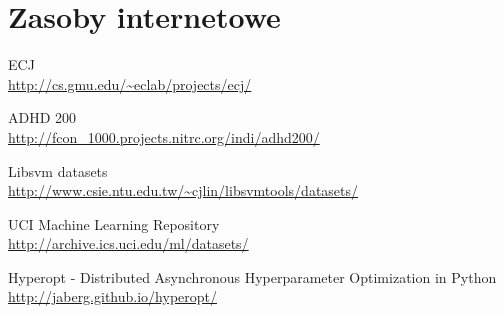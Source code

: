 \chapter*{Zasoby internetowe}\label{sect:web-resources}%

\newcommand{\tturl}{\begingroup \urlstyle{tt}\Url}

{\small
\begin{enumerate}[{[}A{]}]
	\item \label{url:ecj} ECJ \\
		\url{http://cs.gmu.edu/~eclab/projects/ecj/}

	\item \label{url:adhd200} ADHD 200 \\
		\url{	http://fcon_1000.projects.nitrc.org/indi/adhd200/}

	\item \label{url:libsvm} Libsvm datasets \\
		\url{	http://www.csie.ntu.edu.tw/~cjlin/libsvmtools/datasets/}							
	\item \label{url:uci} UCI Machine Learning Repository \\
		\url{http://archive.ics.uci.edu/ml/datasets/}
		
	\item \label{url:hyperopt} Hyperopt - Distributed Asynchronous Hyperparameter Optimization in Python\\
		\url{http://jaberg.github.io/hyperopt/}
		
\end{enumerate}
}
